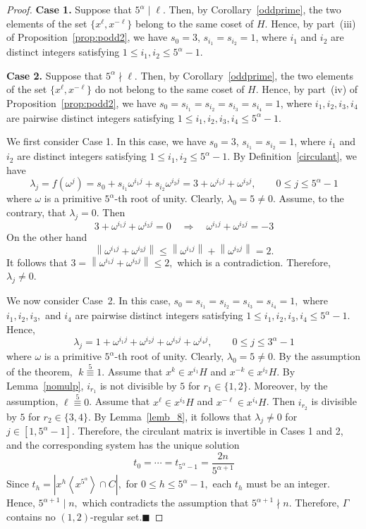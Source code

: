 \documentclass[12pt]{article}
\begin{document}
\begin{proof}
\textbf{Case 1.}  Suppose that $5^\alpha\mid \ell$. Then, by  Corollary~\ref{oddprime}, the two elements of the set $\{x^\ell,x^{-\ell}\}$ belong to the same coset of $H$. Hence, by part~(iii) of Proposition~\ref{prop:podd2}, we have $s_0=3$, $s_{i_1}=s_{i_2}=1$, where $i_1$ and $i_2$ are distinct integers satisfying $1\le i_1,i_2\le 5^\alpha-1$.

\textbf{Case 2.} Suppose that $5^\alpha\nmid \ell$. Then, by Corollary~\ref{oddprime}, the two elements of the set $\{x^\ell,x^{-\ell}\}$ do not belong to the same coset of $H$. Hence, by part~(iv) of Proposition~\ref{prop:podd2}, we have $s_0=s_{i_1}=s_{i_2}=s_{i_3}=s_{i_4}=1$, where $i_1,i_2,i_3,i_4$ are pairwise distinct integers satisfying $1\le i_1,i_2,i_3,i_4\le 5^\alpha-1$.

 We first consider Case 1. In this case, we have $s_0=3$, $s_{i_1}=s_{i_2}=1$, where $i_1$ and $i_2$ are distinct integers satisfying $1\le i_1,i_2\le 5^\alpha-1$. By Definition~\ref{circulant}, we have
\[
\lambda_j=f(\omega^j)
=s_0+s_{i_1}\omega^{i_1j}+s_{i_2}\omega^{i_2j}
=3+\omega^{i_1j}+\omega^{i_2j},
\qquad
0\le j\le 5^{\alpha}-1
\]
where $\omega$ is a primitive $5^{\alpha}$-th root of unity. Clearly, $\lambda_0=5\neq0.$ Assume, to the contrary, that $\lambda_j=0$. Then
\[
3+\omega^{i_1j}+\omega^{i_2j}=0
\quad\Longrightarrow\quad
\omega^{i_1j}+\omega^{i_2j}=-3
\]
On the other hand
\[
\left\|\omega^{i_1j}+\omega^{i_2j}\right\|
\le
\left\|\omega^{i_1j}\right\|
+
\left\|\omega^{i_2j}\right\|
=2.
\]
It follows that
$
3=\left\|\omega^{i_1j}+\omega^{i_2j}\right\|\le2,
$
which is a contradiction. Therefore,
$
\lambda_j\neq0.
$

We now consider Case~2. In this case,
$
s_0=s_{i_1}=s_{i_2}=s_{i_3}=s_{i_4}=1,$
where \(i_1,i_2,i_3,\) and \(i_4\) are pairwise distinct integers satisfying
$
1\le i_1,i_2,i_3,i_4\le 5^{\alpha}-1.
$ Hence,
\begin{equation}\label{eq:lambdaj45}
	\lambda_j
	=
	1+\omega^{i_1j}+\omega^{i_2j}+\omega^{i_3j}+\omega^{i_4j}, \qquad
	0\le j\le 3^{\alpha}-1
\end{equation}
where $\omega$ is a primitive $5^{\alpha}$-th root of unity. Clearly,
$\lambda_0=5\neq0.$  By the assumption of the theorem, $\; k\stackrel{5}{\equiv}1$. Assume that $x^k\in x^{i_1}H$ and $x^{-k}\in x^{i_2}H$. By Lemma~\ref{nomulp}, $i_{r_1}$ is not divisible by $5$ for $r_1\in\{1,2\}$. Moreover, by the assumption, $\ell\stackrel{5}{\equiv}0$. Assume that $x^\ell\in x^{i_3}H$ and $x^{-\ell}\in x^{i_4}H$. Then $i_{r_2}$ is divisible by $5$ for $r_2\in\{3,4\}$.
By Lemma~\ref{lemb_8}, it follows that $\lambda_j\neq0$ for $j\in[1,5^\alpha-1]$. Therefore, the circulant matrix is invertible in Cases 1 and 2, and the corresponding system has the unique solution
\[
t_0=\cdots=t_{5^\alpha-1}=\frac{2n}{5^{\alpha+1}}
\]
Since
$
t_h=\left|x^h\left\langle x^{5^{\alpha}}\right\rangle\cap C\right|,$ for
$0\le h\le5^{\alpha}-1,
$
each \(t_h\) must be an integer. Hence,
$
5^{\alpha+1}\mid n,
$
which contradicts the assumption that
$
5^{\alpha+1}\nmid n.
$
Therefore, \(\Gamma\) contains no \((1,2)\)-regular set.\hfill$\blacksquare$
	\end{proof}
\end{document}
